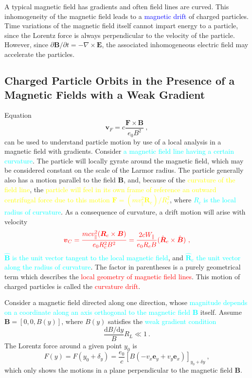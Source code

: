 \documentclass[12pt,a4paper]{article}
\renewcommand{\vec}[1]{\boldsymbol{#1}}
\newcommand{\dif}{\mathrm{d}}
\begin{document}
\cite{1996bspp.book.....B} A typical magnetic field has gradients and often field lines are curved. This inhomogeneity of the magnetic field leads to a \textcolor{blue}{magnetic drift} of charged particles. Time variations of the magnetic field itself cannot impart energy to a particle, since the Lorentz force is always perpendicular to the velocity of the particle. However, since $\partial \vec{B}/\partial t = -\nabla \times \vec{E}$, the associated inhomogeneous electric field may accelerate the particles. 

\subsection{Charged Particle Orbits in the Presence of a Magnetic Fields with a Weak Gradient}
\cite{2015bps..book.....C} Equation 
\begin{equation*}
\vec{v}_F = c \frac{\vec{F} \times \vec{B}}{e_0 B^2} ~,
\end{equation*}
can be used to understand particle motion by use of a local analysis in a magnetic field with gradients. Consider \textcolor{cyan}{a magnetic field line having a certain curvature}. The particle will locally gyrate around the magnetic field, which may be considered constant on the scale of the Larmor radius. The particle generally also has a motion parallel to the field $\vec{B}$, and, because of the \textcolor{yellow}{curvature of the field line}, the \textcolor{yellow}{particle will feel in its own frame of reference an outward centrifugal force due to this motion $\vec{F} = (mv_\parallel^2 \vec{R}_c)/R_c^2$}, where \textcolor{cyan}{$R_c$ is the local radius of curvature}. As a consequence of curvature, a drift motion will arise with velocity
\begin{equation}
\color{red} \vec{v}_C = \frac{mc v_\parallel^2 (\vec{R}_c \times \vec{B})}{e_0 R_c^2 B^2} = \frac{2c W_\parallel}{e_0 R_c B} (\hat{\vec{R}}_c \times \hat{\vec{B}}) ~,
\end{equation}
\textcolor{cyan}{$\hat{\vec{B}}$ is the unit vector tangent to the local magnetic field}, and \textcolor{cyan}{$\hat{\vec{R}}_c$ the unit vector along the radius of curvature}. The factor in parentheses is a purely geometrical term which describes the \textcolor{red}{local geometry of magnetic field lines}. This motion of charged particles is called the \textcolor{red}{curvature drift}.

Consider a magnetic field directed along one direction, whose \textcolor{cyan}{magnitude depends on a coordinate along an axis orthogonal to the magnetic field $\vec{B}$} itself. Assume $\vec{B} = [0, 0, B(y)]$, where $B(y)$ satisfies the \textcolor{cyan}{weak gradient condition}
\begin{equation*}
\frac{\dif B/\dif y}{B} R_L \ll 1 ~.
\end{equation*}
The Lorentz force around a given point $y_0$ is
\begin{equation*}
F(y) = F(y_0 +\delta_y) = \frac{e_0}{c} [B (-v_x \vec{e}_y +v_y \vec{e}_x)]_{y_0+\delta y} ~,
\end{equation*}
which only shows the motions in a plane perpendicular to the magnetic field $\vec{B}$.
\end{document}
